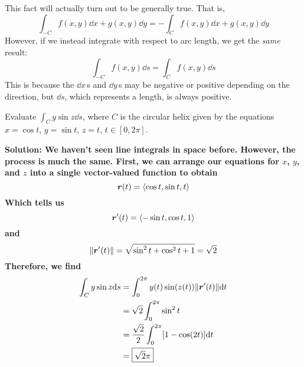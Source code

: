 This fact will actually turn out to be generally true. That is,
\[ \int_{-C}f(x,y)\dd x + g(x,y)\dd y = -\int_C f(x,y)\dd x + g(x,y)\dd y\]
However, if we instead integrate with respect to arc length, we get the \textit{same} result:
\[ \int_{-C}f(x,y)\dd s = \int_C f(x,y)\dd s\]
This is because the $\dd x\,$s and $\dd y\,$s may be negative or positive depending on the direction, but $\dd s$, which represents a length, is always positive.
\begin{example}
    Evaluate $\int_C y\sin z\dd s$, where $C$ is the circular helix given by the equations $x = \cos t$, $y = \sin t$, $z=t$, $t\in[0, 2\pi]$. 
    \par\bf{Solution: }We haven't seen line integrals in space before. However, the process is much the same. First, we can arrange our equations for $x$, $y$, and $z$ into a single vector-valued function to obtain
    \[ \boldsymbol{r}(t) = \left\langle \cos t, \sin t, t\right\rangle \]
    Which tells us
    \[ \boldsymbol{r}'(t) = \left\langle -\sin t, \cos t, 1 \right\rangle\]
    and 
    \[ \norm{\boldsymbol{r}'(t)} = \sqrt{\sin^2t + \cos^2t + 1} = \sqrt 2\]
    Therefore, we find
    \begin{align*}
        \int_C y\sin z \dd s &= \int_0^{2\pi}y(t)\sin(z(t))\norm{\boldsymbol{r}'(t)}\dd t\\
        &= \sqrt 2\int_0^{2\pi}\sin^2t\\& = \frac{\sqrt 2}2\int_0^{2\pi}[1-\cos(2t)]\dd t \\
        &= \boxed{\sqrt{2}\pi}
    \end{align*}
\end{example}
